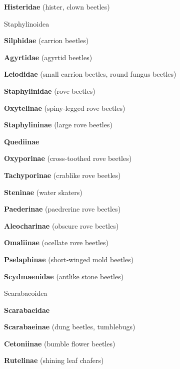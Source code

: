 \documentclass[letterpaper,10pt]{article}
\begin{document}
{\makebox[0.6cm]{}  \textbf{Histeridae} (hister, clown beetles) \par
\makebox[0.40cm]{}  Staphylinoidea \par
\makebox[0.6cm]{}  \textbf{Silphidae} (carrion beetles) \par
\makebox[0.6cm]{}  \textbf{Agyrtidae} (agyrtid beetles) \par
\makebox[0.6cm]{}  \textbf{Leiodidae} (small carrion beetles, round fungus beetles) \par
\makebox[0.6cm]{}  \textbf{Staphylinidae} (rove beetles) \par
\makebox[0.8cm]{}  \textbf{Oxytelinae} (spiny-legged rove beetles) \par
\makebox[0.8cm]{}  \textbf{Staphylininae} (large rove beetles) \par
\makebox[0.8cm]{}  \textbf{Quediinae} \par
\makebox[0.8cm]{}  \textbf{Oxyporinae} (cross-toothed rove beetles) \par
\makebox[0.8cm]{}  \textbf{Tachyporinae} (crablike rove beetles) \par
\makebox[0.8cm]{}  \textbf{Steninae} (water skaters) \par
\makebox[0.8cm]{}  \textbf{Paederinae} (paedrerine rove beetles) \par
\makebox[0.8cm]{}  \textbf{Aleocharinae} (obscure rove beetles) \par
\makebox[0.8cm]{}  \textbf{Omaliinae} (ocellate rove beetles) \par
\makebox[0.8cm]{}  \textbf{Pselaphinae} (short-winged mold beetles) \par
\makebox[0.6cm]{}  \textbf{Scydmaenidae} (antlike stone beetles) \par
\makebox[0.40cm]{}  Scarabaeoidea \par
\makebox[0.6cm]{}  \textbf{Scarabaeidae} \par
\makebox[0.8cm]{}  \textbf{Scarabaeinae} (dung beetles, tumblebugs) \par
\makebox[0.8cm]{}  \textbf{Cetoniinae} (bumble flower beetles) \par
\makebox[0.8cm]{}  \textbf{Rutelinae} (shining leaf chafers) \par
}
\end{document}
